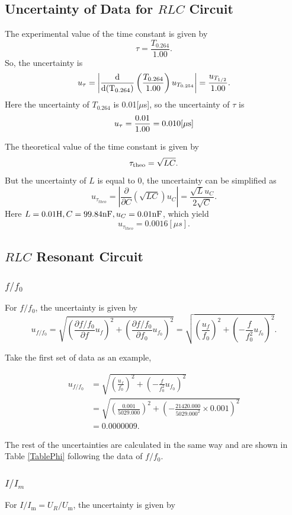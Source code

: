 \documentclass{article}
\begin{document}
\subsection{Uncertainty of Data for $RLC$ Circuit}
The experimental value of the time constant is given by 
\[\tau=\frac{T_{0.264}}{1.00}.\] 
So, the uncertainty is 
\[u_{\tau}=\left|\frac{\rm d}{\rm d (T_{0.264})}\left(\frac{T_{0.264}}{1.00}\right)u_{T_{0.254}}\right|=\frac{u_{T_{1/2}}}{1.00}.\] 
Here the uncertainty of $T_{0.264} $ is 0.01$[\mu$s], so the uncertainty of $\tau$ is 
\[u_{\tau}=\frac{0.01}{1.00}=0.010[\mu \rm s]\]

The theoretical value of the time constant is given by 
\[\tau_{\rm theo}=\sqrt{LC}.\] 
But the uncertainty of $L$ is equal to 0, the uncertainty can be simplified as 
\[u_{\tau_{theo}}=\left|\frac{\partial}{\partial C}(\sqrt{LC})u_C\right|=\frac{\sqrt{L}u_C}{2\sqrt{C}}.\] 
Here $L=0.01{\rm H},C=99.84{\rm nF}, u_C=0.01{\rm nF}$, which yield
\[u_{\tau_{theo}}=0.0016[\mu s].\]

\subsection{$RLC$ Resonant Circuit}

\subsubsection{$f/f_0$}

For $f/f_0$, the uncertainty is given by
$$u_{f/f_0} = \sqrt{(\frac{\partial f/f_0}{\partial f}u_f)^2 + (\frac{\partial f/f_0}{\partial f_0}u_{f_0})^2} = \sqrt{(\frac{u_f}{f_0})^2 + (-\frac{f}{f_0^2}u_{f_0})^2}.$$

Take the first set of data as an example,

\begin{align*}
    u_{f/f_0} & = \sqrt{(\frac{u_f}{f_0})^2 + (-\frac{f}{f_0^2}u_{f_0})^2}                         \\
              & = \sqrt{(\frac{0.001}{5029.000})^2 + (-\frac{21420.000}{5029.000^2}\times 0.001)^2} \\
              & = 0.0000009.
\end{align*}

The rest of the uncertainties are calculated in the same way and are shown in Table \ref{TablePhi} following the data of $f/f_0$.

\subsubsection{$I/I_m$}
For $I/I_\text{m} = U_R/U_\text{m}$, the uncertainty is given by
\end{document}
